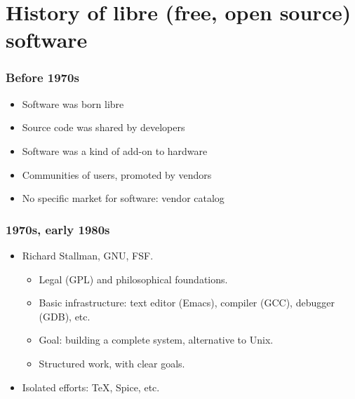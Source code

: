 %

\section{History of libre (free, open source) software}


\begin{frame}
\frametitle{Before 1970s}

\begin{itemize}
\item Software was born libre
\item Source code was shared by developers
\item Software was a kind of add-on to hardware
\item Communities of users, promoted by vendors
\item No specific market for software: vendor catalog
\end{itemize}
\end{frame}

\begin{frame}
\frametitle{1970s, early 1980s}

\begin{itemize}
\item Richard Stallman, GNU, FSF.
  \begin{itemize}
  \item Legal (GPL) and philosophical foundations.
  \item Basic infrastructure: text editor (Emacs), compiler (GCC),
    debugger (GDB), etc.
  \item Goal: building a complete system, alternative to Unix.
  \item Structured work, with clear goals.
  \end{itemize}
\item Isolated efforts: TeX, Spice, etc.
\end{itemize}
\end{frame}


